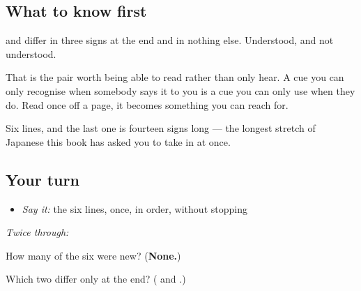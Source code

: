 \subsection*{What to know first}
\textbf{} and \textbf{} differ in three signs at the end and in nothing else. Understood, and not understood.

That is the pair worth being able to read rather than only hear. A cue you can only recognise when somebody says it to you is a cue you can only use when they do. Read once off a page, it becomes something you can reach for.

Six lines, and the last one is fourteen signs long — the longest stretch of Japanese this book has asked you to take in at once.

\subsection*{Your turn}
\begin{itemize}
\raggedright
  \item \emph{Say it:} the six lines, once, in order, without stopping
\end{itemize}

\emph{Twice through:}

\begin{tcolorbox}[breakable,colback=teal!4,colframe=teal!35!black,title={Before you move on}]
How many of the six were new? (\textbf{None.})

Which two differ only at the end? (\textbf{} and \textbf{}.)
\end{tcolorbox}
